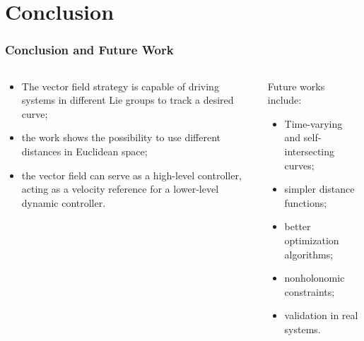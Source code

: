 \section{Conclusion}

\begin{frame}

    \frametitle{Conclusion and Future Work}
    \begin{columns}[c]
        \begin{column}{0.6\linewidth}
            \begin{itemize}
                \item The vector field strategy is capable of driving systems in different Lie groups to track a desired curve;
                \item the work shows the possibility to use different distances in Euclidean space;
                \item the vector field can serve as a high-level controller, acting
                as a velocity reference for a lower-level dynamic controller.
            \end{itemize}
        \end{column}
        \begin{column}{0.4\linewidth}
            Future works include:
            \begin{itemize}
                \item Time-varying and self-intersecting curves;
                \item simpler distance functions;
                \item better optimization algorithms;
                \item nonholonomic constraints;
                \item validation in real systems.
            \end{itemize}
        \end{column}
        
    \end{columns}
\end{frame}

